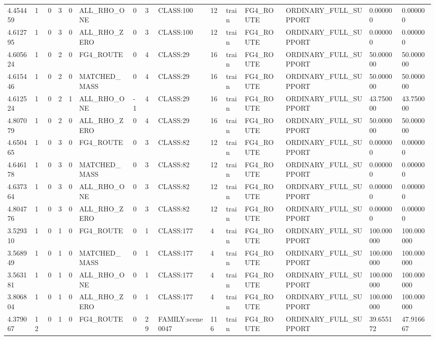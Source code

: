 \begin{tabular}{lllllllllllllll}
4.454459 & 1 & 0 & 3 & 0 & ALL\_RHO\_ONE & 0 & 3 & CLASS:100 & 12 & train & FG4\_ROUTE & ORDINARY\_FULL\_SUPPORT & 0.000000 & 0.000000 \\
4.612795 & 1 & 0 & 3 & 0 & ALL\_RHO\_ZERO & 0 & 3 & CLASS:100 & 12 & train & FG4\_ROUTE & ORDINARY\_FULL\_SUPPORT & 0.000000 & 0.000000 \\
4.605624 & 1 & 0 & 2 & 0 & FG4\_ROUTE & 0 & 4 & CLASS:29 & 16 & train & FG4\_ROUTE & ORDINARY\_FULL\_SUPPORT & 50.000000 & 50.000000 \\
4.615446 & 1 & 0 & 2 & 0 & MATCHED\_MASS & 0 & 4 & CLASS:29 & 16 & train & FG4\_ROUTE & ORDINARY\_FULL\_SUPPORT & 50.000000 & 50.000000 \\
4.612524 & 1 & 0 & 2 & 1 & ALL\_RHO\_ONE & -1 & 4 & CLASS:29 & 16 & train & FG4\_ROUTE & ORDINARY\_FULL\_SUPPORT & 43.750000 & 43.750000 \\
4.807079 & 1 & 0 & 2 & 0 & ALL\_RHO\_ZERO & 0 & 4 & CLASS:29 & 16 & train & FG4\_ROUTE & ORDINARY\_FULL\_SUPPORT & 50.000000 & 50.000000 \\
4.650465 & 1 & 0 & 3 & 0 & FG4\_ROUTE & 0 & 3 & CLASS:82 & 12 & train & FG4\_ROUTE & ORDINARY\_FULL\_SUPPORT & 0.000000 & 0.000000 \\
4.646178 & 1 & 0 & 3 & 0 & MATCHED\_MASS & 0 & 3 & CLASS:82 & 12 & train & FG4\_ROUTE & ORDINARY\_FULL\_SUPPORT & 0.000000 & 0.000000 \\
4.637364 & 1 & 0 & 3 & 0 & ALL\_RHO\_ONE & 0 & 3 & CLASS:82 & 12 & train & FG4\_ROUTE & ORDINARY\_FULL\_SUPPORT & 0.000000 & 0.000000 \\
4.804776 & 1 & 0 & 3 & 0 & ALL\_RHO\_ZERO & 0 & 3 & CLASS:82 & 12 & train & FG4\_ROUTE & ORDINARY\_FULL\_SUPPORT & 0.000000 & 0.000000 \\
3.529310 & 1 & 0 & 1 & 0 & FG4\_ROUTE & 0 & 1 & CLASS:177 & 4 & train & FG4\_ROUTE & ORDINARY\_FULL\_SUPPORT & 100.000000 & 100.000000 \\
3.568949 & 1 & 0 & 1 & 0 & MATCHED\_MASS & 0 & 1 & CLASS:177 & 4 & train & FG4\_ROUTE & ORDINARY\_FULL\_SUPPORT & 100.000000 & 100.000000 \\
3.563181 & 1 & 0 & 1 & 0 & ALL\_RHO\_ONE & 0 & 1 & CLASS:177 & 4 & train & FG4\_ROUTE & ORDINARY\_FULL\_SUPPORT & 100.000000 & 100.000000 \\
3.806804 & 1 & 0 & 1 & 0 & ALL\_RHO\_ZERO & 0 & 1 & CLASS:177 & 4 & train & FG4\_ROUTE & ORDINARY\_FULL\_SUPPORT & 100.000000 & 100.000000 \\
4.379067 & 12 & 0 & 1 & 0 & FG4\_ROUTE & 0 & 29 & FAMILY:scene0047 & 116 & train & FG4\_ROUTE & ORDINARY\_FULL\_SUPPORT & 39.655172 & 47.916667 \\

\end{tabular}
